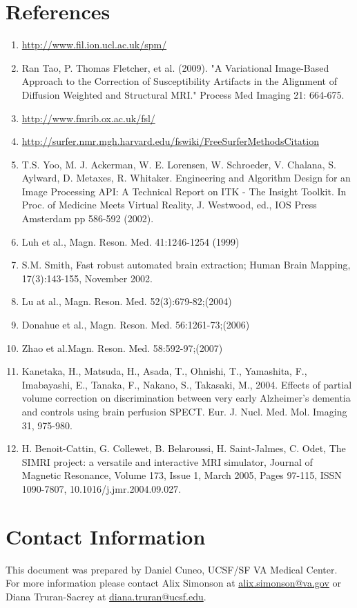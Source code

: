 \documentclass[letterpaper,11pt]{article}
\begin{document}
\section*{References}
\begin{enumerate}
\item  \url{http://www.fil.ion.ucl.ac.uk/spm/} \\
\item  Ran Tao, P. Thomas Fletcher, et al. (2009). "A Variational Image-Based Approach to the Correction of Susceptibility Artifacts in the Alignment of Diffusion Weighted and Structural MRI." Process Med Imaging 21: 664-675.  \\
\item \url{http://www.fmrib.ox.ac.uk/fsl/} \\
\item  \url{http://surfer.nmr.mgh.harvard.edu/fswiki/FreeSurferMethodsCitation} \\
\item T.S. Yoo, M. J. Ackerman, W. E. Lorensen, W. Schroeder, V. Chalana, S. Aylward, D. Metaxes, R. Whitaker. Engineering and Algorithm Design for an Image Processing API: A Technical Report on ITK - The Insight Toolkit. In Proc. of Medicine Meets Virtual Reality, J. Westwood, ed., IOS Press Amsterdam pp 586-592 (2002). 
\item  Luh et al., Magn. Reson. Med. 41:1246-1254 (1999) \\
\item S.M. Smith, Fast robust automated brain extraction; Human Brain Mapping,
17(3):143-155, November 2002.
\item Lu at al., Magn. Reson. Med. 52(3):679-82;(2004) \\
\item Donahue et al., Magn. Reson. Med. 56:1261-73;(2006) \\
\item Zhao et al.Magn. Reson. Med. 58:592-97;(2007)
\item Kanetaka, H., Matsuda, H., Asada, T., Ohnishi, T., Yamashita, F., Imabayashi, E., Tanaka, F., Nakano, S., Takasaki, M., 2004. Effects of partial volume correction on discrimination between very early Alzheimer's dementia and controls using brain perfusion SPECT. Eur. J. Nucl. Med. Mol. Imaging 31, 975-980.
\item H. Benoit-Cattin, G. Collewet, B. Belaroussi, H. Saint-Jalmes, C. Odet, The SIMRI project: a versatile and interactive MRI simulator, Journal of Magnetic Resonance, Volume 173, Issue 1, March 2005, Pages 97-115, ISSN 1090-7807, 10.1016/j.jmr.2004.09.027.


\end{enumerate}

\section*{Contact Information}
This document was prepared by Daniel Cuneo, UCSF/SF VA Medical Center. For more information please contact Alix Simonson at \url{alix.simonson@va.gov} or Diana Truran-Sacrey at \url{diana.truran@ucsf.edu}.
\end{document}
